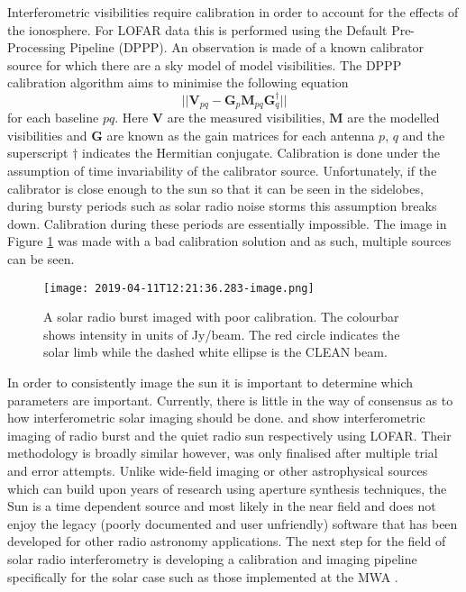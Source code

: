 Interferometric visibilities require calibration in order to account for the effects of the ionosphere. For LOFAR data this is performed using the Default Pre-Processing Pipeline (DPPP). An observation is made of a known calibrator source for which there are a sky model of model visibilities. The DPPP calibration algorithm aims to minimise the following equation
\begin{equation}
\label{eq:gain}
\vert \vert \mathbf{V}_{pq} - \mathbf{G}_p \mathbf{M}_{pq} \mathbf{G}^\dag_q \vert \vert
\end{equation}
for each baseline $pq$. Here $\mathbf{V}$ are the measured visibilities, $\mathbf{M}$ are the modelled visibilities and $\mathbf{G}$ are known as the gain matrices for each antenna $p$, $q$ and the superscript $\dag$ indicates the Hermitian conjugate. Calibration is done under the assumption of time invariability of the calibrator source. Unfortunately, if the calibrator is close enough to the sun so that it can be seen in the sidelobes, during bursty periods such as solar radio noise storms this assumption breaks down. Calibration during these periods are essentially impossible. The image in Figure \ref{fig:bad_cal} was made with a bad calibration solution and as such, multiple sources can be seen.

\begin{figure}[ht]
\centering
\texttt{[image: 2019-04-11T12:21:36.283-image.png]}
\caption[An example of a solar radio burst imaged with poor calibration.]{A solar radio burst imaged with poor calibration. The colourbar shows intensity in units of Jy/beam. The red circle indicates the solar limb while the dashed white ellipse is the CLEAN beam.}
\label{fig:bad_cal}
\end{figure}

In order to consistently image the sun it is important to determine which parameters are important. Currently, there is little in the way of consensus as to how interferometric solar imaging should be done. \cite{Maguire2021} and \cite{Ryan2021} show interferometric imaging of radio burst and the quiet radio sun respectively using LOFAR. Their methodology is broadly similar however, was only finalised after multiple trial and error attempts. Unlike wide-field imaging or other astrophysical sources which can build upon years of research using aperture synthesis techniques, the Sun is a time dependent source and most likely in the near field and does not enjoy the legacy (poorly documented and user unfriendly) software that has been developed for other radio astronomy applications. The next step for the field of solar radio interferometry is developing a calibration and imaging pipeline specifically for the solar case such as those implemented at the MWA \citep[e.g.][]{Mondal2019}.

